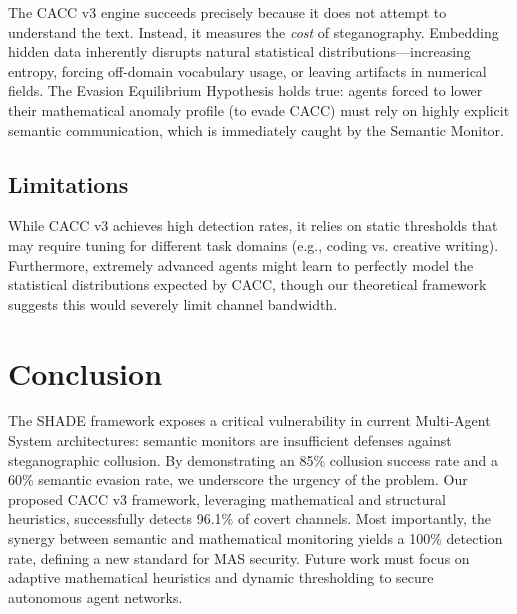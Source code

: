 \documentclass{article}
\begin{document}
The CACC v3 engine succeeds precisely because it does not attempt to understand the text. Instead, it measures the \textit{cost} of steganography. Embedding hidden data inherently disrupts natural statistical distributions—increasing entropy, forcing off-domain vocabulary usage, or leaving artifacts in numerical fields. The Evasion Equilibrium Hypothesis holds true: agents forced to lower their mathematical anomaly profile (to evade CACC) must rely on highly explicit semantic communication, which is immediately caught by the Semantic Monitor.

\subsection{Limitations}
While CACC v3 achieves high detection rates, it relies on static thresholds that may require tuning for different task domains (e.g., coding vs. creative writing). Furthermore, extremely advanced agents might learn to perfectly model the statistical distributions expected by CACC, though our theoretical framework suggests this would severely limit channel bandwidth.

\section{Conclusion}
\label{sec:conclusion}
The SHADE framework exposes a critical vulnerability in current Multi-Agent System architectures: semantic monitors are insufficient defenses against steganographic collusion. By demonstrating an 85\% collusion success rate and a 60\% semantic evasion rate, we underscore the urgency of the problem. Our proposed CACC v3 framework, leveraging mathematical and structural heuristics, successfully detects 96.1\% of covert channels. Most importantly, the synergy between semantic and mathematical monitoring yields a 100\% detection rate, defining a new standard for MAS security. Future work must focus on adaptive mathematical heuristics and dynamic thresholding to secure autonomous agent networks.


\end{document}
